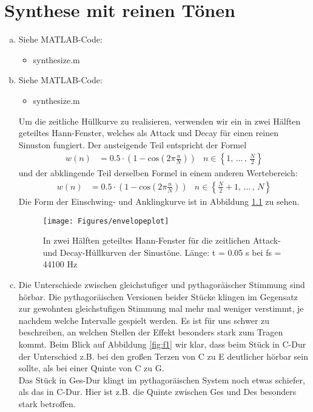 \chapter{Synthese mit reinen Tönen}


\begin{enumerate}[a)]
\item Siehe MATLAB-Code:
\begin{itemize}
\item
synthesize.m
\end{itemize}
\item
Siehe MATLAB-Code:
\begin{itemize}
\item
synthesize.m
\end{itemize}
\vspace{\baselineskip}
Um die zeitliche Hüllkurve zu realisieren, verwenden wir ein in zwei Hälften geteiltes Hann-Fenster, welches als Attack und Decay für einen reinen Sinuston fungiert. Der ansteigende Teil entspricht der Formel
\begin{align*}
w(n) &= 0.5 \cdot (1- \mathrm{cos}(2 \pi \frac{n}{N})) & n \in \left\{1,\,...\,,\,\frac{N}{2}\right\}
\end{align*}
und der abklingende Teil derselben Formel in einem anderen Wertebereich:
\begin{align*}
w(n) &= 0.5 \cdot (1- \mathrm{cos}(2 \pi \frac{n}{N})) & n \in \left\{\frac{N}{2}+1,\,...\,,\,N\right\}
\end{align*}
Die Form der Einschwing- und Anklingkurve ist in Abbildung \ref{fig:env} zu sehen.
\begin{figure}[h!]
  \centering
      \texttt{[image: Figures/envelopeplot]}
 \caption{In zwei Hälften geteiltes Hann-Fenster für die zeitlichen Attack- und Decay-Hüllkurven der Sinustöne. Länge: t = 0.05 s bei fs = 44100 Hz}
	\label{fig:env}
\end{figure}
\item
Die Unterschiede zwischen gleichstufiger und pythagoräischer Stimmung sind hörbar. Die pythagoräischen Versionen beider Stücke klingen im Gegensatz zur gewohnten gleichstufigen Stimmung mal mehr mal weniger verstimmt, je nachdem welche Intervalle gespielt werden. Es ist für uns schwer zu beschreiben, an welchen Stellen der Effekt besonders stark zum Tragen kommt. Beim Blick auf Abbildung \ref{fig:f1} wir klar, dass beim Stück in C-Dur der Unterschied z.B. bei den großen Terzen von C zu E deutlicher hörbar sein sollte, als bei einer Quinte von C zu G. \\
Das Stück in Ges-Dur klingt im pythagoräischen System noch etwas schiefer, als das in C-Dur. Hier ist z.B. die Quinte zwischen Ges und Des besonders stark betroffen.\\ 
\end{enumerate}
